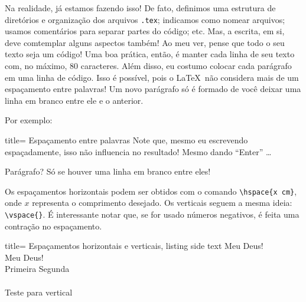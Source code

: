 Na realidade, já estamos fazendo isso!
De fato, definimos uma estrutura de diretórios e organização dos arquivos 
\texttt{.tex}; indicamos como nomear arquivos; usamos comentários para separar 
partes do código; etc. 
Mas, a escrita, em si, deve comtemplar alguns aspectos também!
Ao meu ver, pense que todo o seu texto seja um código!
Uma boa prática, então, é manter cada linha de seu texto com, no máximo, 80 
caracteres.
Além disso, eu costumo colocar cada parágrafo em uma linha de código.
Isso é possível, pois o \LaTeX\ não considera mais de um espaçamento entre 
palavras!
Um novo parágrafo só é formado de você deixar uma linha em branco entre ele e o
anterior.

Por exemplo:

\begin{tcblisting}{title= Espaçamento entre palavras}
  Note         que, mesmo        eu    escrevendo
  espaçadamente, isso não    influencia no
  resultado!
  Mesmo dando ``Enter'' \ldots
  
  Parágrafo? Só se houver uma linha em branco entre eles!
\end{tcblisting}

Os espaçamentos \textsf{horizontais} podem ser obtidos com o comando 
\Verb|\hspace{x cm}|, onde $x$ representa o comprimento desejado.
Os \textsf{verticais} seguem a mesma ideia: \Verb|\vspace{}|.
É interessante notar que, se for usado números negativos, é feita uma contração 
no espaçamento. 

\begin{tcblisting}{title= Espaçamentos horizontais e verticais, listing side text}
Meu \hspace{2cm} Deus!\\
Meu \hspace{-0.5cm} Deus!\\
Primeira \hfill Segunda\\
\vspace*{0.7cm}\\
Teste para vertical
\end{tcblisting}  


